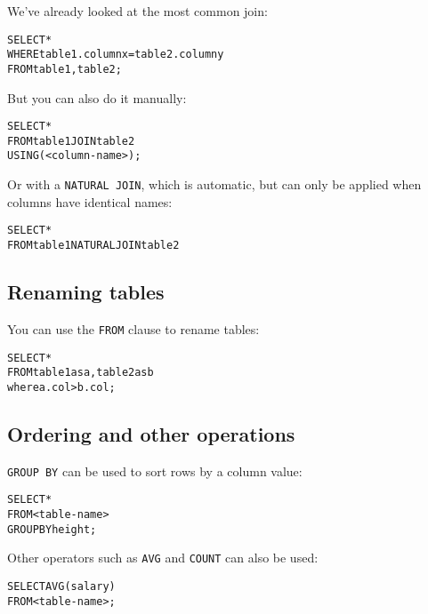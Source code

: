 \begin{mymulticols}
  We've already looked at the most common join:

  \begin{alltt}
    SELECT *\\
    WHERE table1.columnx = table2.columny\\
    FROM table1, table2;
  \end{alltt}

  But you can also do it manually:

  \begin{alltt}
    SELECT *\\
    FROM table1 JOIN table2\\
    USING (<column-name>);
  \end{alltt}

  Or with a \texttt{NATURAL JOIN}, which is automatic, but can only be applied
  when columns have identical names:

  \begin{alltt}
    SELECT *\\
    FROM table1 NATURAL JOIN table2
  \end{alltt}

  \subsection{Renaming tables}

  You can use the \texttt{FROM} clause to rename tables:

  \begin{alltt}
    SELECT *\\
    FROM table1 as a, table2 as b\\
    where a.col > b.col;
  \end{alltt}

  \subsection{Ordering and other operations}

  \texttt{GROUP BY} can be used to sort rows by a column value:

  \begin{alltt}
    SELECT *\\
    FROM <table-name>\\
    GROUP BY height;
  \end{alltt}

  Other operators such as \texttt{AVG} and \texttt{COUNT} can also be used:

  \begin{alltt}
    SELECT AVG(salary)\\
    FROM <table-name>;  
  \end{alltt}


\end{mymulticols}
